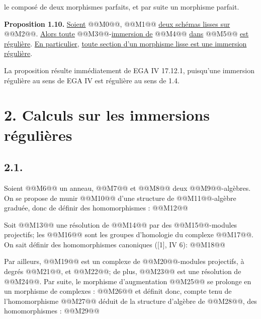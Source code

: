 
le composé de deux morphismes parfaits, et par suite un morphisme parfait.

\textbf{Proposition 1.10.} \uline{Soient} @@M0@@, @@M1@@ \uline{deux schémas lisses sur} @@M2@@. \uline{Alors toute} @@M3@@-\uline{immersion de} @@M4@@ \uline{dans} @@M5@@ \uline{est régulière}. \uline{En particulier}, \uline{toute section d'un morphisme lisse est une immersion régulière}.

La proposition résulte immédiatement de EGA IV 17.12.1, puisqu'une immersion régulière au sens de EGA IV est régulière au sens de 1.4.

\section*{2. Calculs sur les immersions régulières}

\subsection*{2.1.}
Soient @@M6@@ un anneau, @@M7@@ et @@M8@@ deux @@M9@@-algèbres. On se propose de munir @@M10@@ d'une structure de @@M11@@-algèbre graduée, donc de définir des homomorphismes :
@@M12@@

Soit @@M13@@ une résolution de @@M14@@ par des @@M15@@-modules projectifs; les @@M16@@ sont les groupes d'homologie du complexe @@M17@@. On sait définir des homomorphismes canoniques ([1], IV 6):
@@M18@@

Par ailleurs, @@M19@@ est un complexe de @@M20@@-modules projectifs, à degrés @@M21@@, et @@M22@@; de plus, @@M23@@ est une résolution de @@M24@@. Par suite, le morphisme d'augmentation @@M25@@ se prolonge en un morphisme de complexes : @@M26@@ et définit donc, compte tenu de l'homomorphisme @@M27@@ déduit de la structure d'algèbre de @@M28@@, des homomorphismes :
@@M29@@
